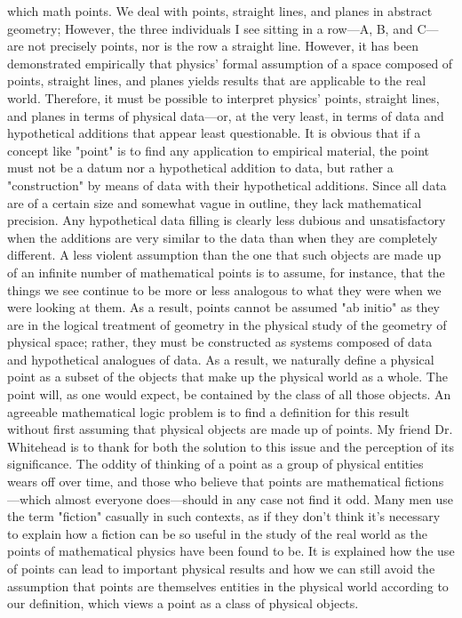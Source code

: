 \documentclass[a4paper,12pt]{book}[2004/02/16]
\theoremstyle{ilemma}
\theoremstyle{itheorem}
\theoremstyle{iother}
\theoremstyle{icorollary}
\theoremstyle{numcorollary}
\theoremstyle{idefinition}
\begin{document}
which math points. We deal with points, straight lines, and planes in abstract geometry; However, the three individuals I see sitting in a row—A, B, and C—are not precisely points, nor is the row a straight line. However, it has been demonstrated empirically that physics' formal assumption of a space composed of points, straight lines, and planes yields results that are applicable to the real world. Therefore, it must be possible to interpret physics' points, straight lines, and planes in terms of physical data—or, at the very least, in terms of data and hypothetical additions that appear least questionable. It is obvious that if a concept like "point" is to find any application to empirical material, the point must not be a datum nor a hypothetical addition to data, but rather a "construction" by means of data with their hypothetical additions. Since all data are of a certain size and somewhat vague in outline, they lack mathematical precision. Any hypothetical data filling is clearly less dubious and unsatisfactory when the additions are very similar to the data than when they are completely different. A less violent assumption than the one that such objects are made up of an infinite number of mathematical points is to assume, for instance, that the things we see continue to be more or less analogous to what they were when we were looking at them. As a result, points cannot be assumed "ab initio" as they are in the logical treatment of geometry in the physical study of the geometry of physical space; rather, they must be constructed as systems composed of data and hypothetical analogues of data. As a result, we naturally define a physical point as a subset of the objects that make up the physical world as a whole. The point will, as one would expect, be contained by the class of all those objects. An agreeable mathematical logic problem is to find a definition for this result without first assuming that physical objects are made up of points. My friend Dr. Whitehead is to thank for both the solution to this issue and the perception of its significance. The oddity of thinking of a point as a group of physical entities wears off over time, and those who believe that points are mathematical fictions—which almost everyone does—should in any case not find it odd. Many men use the term "fiction" casually in such contexts, as if they don't think it's necessary to explain how a fiction can be so useful in the study of the real world as the points of mathematical physics have been found to be. It is explained how the use of points can lead to important physical results and how we can still avoid the assumption that points are themselves entities in the physical world according to our definition, which views a point as a class of physical objects.
\end{document}
